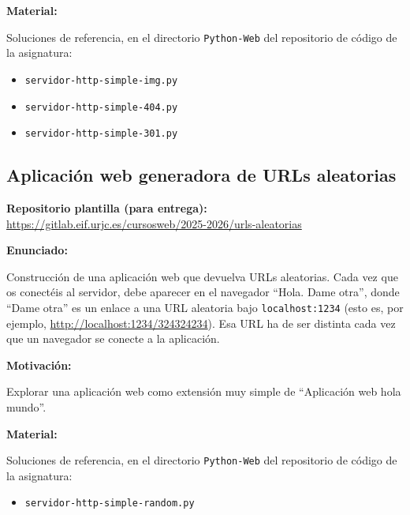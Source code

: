 \textbf{Material:}

Soluciones de referencia, en el directorio \verb|Python-Web| del repositorio de código de la asignatura:


\begin{itemize}
\item \verb|servidor-http-simple-img.py|
\item \verb|servidor-http-simple-404.py|
\item \verb|servidor-http-simple-301.py|
\end{itemize}

\subsection{Aplicación web generadora de URLs aleatorias}
\label{subsec:aplweb-urls-aleatorias}

\textbf{Repositorio plantilla (para entrega):} \\
\url{https://gitlab.eif.urjc.es/cursosweb/2025-2026/urls-aleatorias}

\textbf{Enunciado:}

Construcción de una aplicación web que devuelva URLs aleatorias. Cada vez que os conectéis al servidor, debe aparecer en el navegador ``Hola. Dame otra'', donde ``Dame otra'' es un enlace a una URL aleatoria bajo \verb|localhost:1234| (esto es, por ejemplo, \url{http://localhost:1234/324324234}). Esa URL ha de ser distinta cada vez que un navegador se conecte a la aplicación.


\textbf{Motivación:}

Explorar una aplicación web como extensión muy simple de ``Aplicación web hola mundo''.

\textbf{Material:}

Soluciones de referencia, en el directorio \verb|Python-Web| del repositorio de código de la asignatura:


\begin{itemize}
\item \verb|servidor-http-simple-random.py|
\end{itemize}

